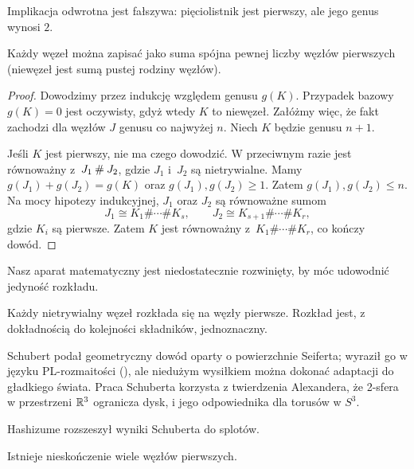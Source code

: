 Implikacja odwrotna jest fałszywa: pięciolistnik jest pierwszy, ale jego genus wynosi $2$.

\begin{proposition}
    Każdy węzeł można zapisać jako suma spójna pewnej liczby węzłów pierwszych (niewęzeł jest sumą pustej rodziny węzłów).
\end{proposition}

\begin{proof}
    Dowodzimy przez indukcję względem genusu $g(K)$.
    Przypadek bazowy $g(K) = 0$ jest oczywisty, gdyż wtedy $K$ to niewęzeł.
    Załóżmy więc, że fakt zachodzi dla węzłów $J$ genusu co najwyżej $n$.
    Niech $K$ będzie genusu $n + 1$.

    Jeśli $K$ jest pierwszy, nie ma czego dowodzić.
    W przeciwnym razie jest równoważny z~$J_1 \mathbin{\#} J_2$, gdzie $J_1$ i~$J_2$ są nietrywialne.
    Mamy $g(J_1) + g(J_2) = g(K)$ oraz $g(J_1),g(J_2) \ge 1$.
    Zatem $g(J_1), g(J_2) \le n$.
    Na mocy hipotezy indukcyjnej, $J_1$ oraz $J_2$ są równoważne sumom
    \[
        J_1 \cong K_1\#\cdots\# K_s,\qquad
        J_2 \cong K_{s+1}\#\cdots\# K_r,
    \]
    gdzie $K_i$ są pierwsze.
    Zatem $K$ jest równoważny z~$K_1\#\cdots\# K_r$, co kończy dowód.
\end{proof}

Nasz aparat matematyczny jest niedostatecznie rozwinięty, by móc udowodnić jedyność rozkładu.

\begin{theorem}[Schubert, 1949]
    Każdy nietrywialny węzeł rozkłada się na węzły pierwsze.
    Rozkład jest, z dokładnością do kolejności składników, jednoznaczny.
%
\end{theorem}

Schubert podał geometryczny dowód oparty o powierzchnie Seiferta; wyraził go w języku PL-rozmaitości (\cite{schubert49}), ale niedużym wysiłkiem można dokonać adaptacji do gładkiego świata.
Praca Schuberta korzysta z twierdzenia Alexandera, że 2-sfera w przestrzeni $\mathbb R^3$ ogranicza dysk, i jego odpowiednika dla torusów w $S^3$.

Hashizume \cite{hashizume58} rozszeszył wyniki Schuberta do splotów.

\begin{proposition}
    \label{prp:infinitely_many_prime_knots}
    Istnieje nieskończenie wiele węzłów pierwszych.
\end{proposition}

